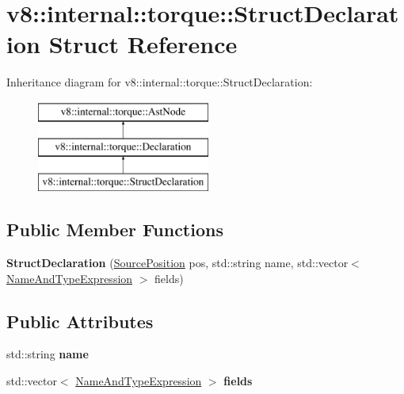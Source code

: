\hypertarget{structv8_1_1internal_1_1torque_1_1StructDeclaration}{}\section{v8\+:\+:internal\+:\+:torque\+:\+:Struct\+Declaration Struct Reference}
\label{structv8_1_1internal_1_1torque_1_1StructDeclaration}
Inheritance diagram for v8\+:\+:internal\+:\+:torque\+:\+:Struct\+Declaration\+:\begin{figure}[H]
\begin{center}
\leavevmode
\includegraphics[height=3.000000cm]{structv8_1_1internal_1_1torque_1_1StructDeclaration}
\end{center}
\end{figure}
\subsection*{Public Member Functions}
\begin{DoxyCompactItemize}
\item 
\mbox{\label{structv8_1_1internal_1_1torque_1_1StructDeclaration_ab260c7971ab93696a0647ba43d2fe546}} 
{\bfseries Struct\+Declaration} (\mbox{\hyperlink{structv8_1_1internal_1_1torque_1_1SourcePosition}{Source\+Position}} pos, std\+::string name, std\+::vector$<$ \mbox{\hyperlink{structv8_1_1internal_1_1torque_1_1NameAndTypeExpression}{Name\+And\+Type\+Expression}} $>$ fields)
\end{DoxyCompactItemize}
\subsection*{Public Attributes}
\begin{DoxyCompactItemize}
\item 
\mbox{\label{structv8_1_1internal_1_1torque_1_1StructDeclaration_acf3118c8a73e6c682197dcb18a032084}} 
std\+::string {\bfseries name}
\item 
\mbox{\label{structv8_1_1internal_1_1torque_1_1StructDeclaration_a63986e7b08e32d0c4526146df00bd7b7}} 
std\+::vector$<$ \mbox{\hyperlink{structv8_1_1internal_1_1torque_1_1NameAndTypeExpression}{Name\+And\+Type\+Expression}} $>$ {\bfseries fields}
\end{DoxyCompactItemize}

